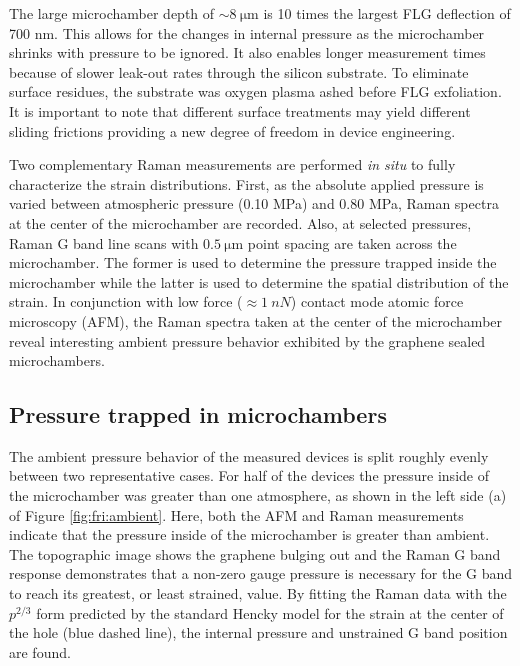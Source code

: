 The large microchamber depth of $\sim 8 \ \mathrm{\mu m}$ is 10 times the largest FLG deflection of 700 nm.
This allows for the changes in internal pressure as the microchamber shrinks with pressure to be ignored.
It also enables longer measurement times because of slower leak-out rates through the silicon substrate.
To eliminate surface residues, the substrate was oxygen plasma ashed before FLG exfoliation.
It is important to note that different surface treatments may yield different sliding frictions providing a new degree of freedom in device engineering. 

Two complementary Raman measurements are performed \emph{in situ} to fully characterize the strain distributions.
First, as the absolute applied pressure is varied between atmospheric pressure (0.10 MPa) and 0.80 MPa, Raman spectra at the center of the microchamber are recorded.
Also, at selected pressures, Raman G band line scans with $ 0.5 \ \mathrm{\mu m}$ point spacing are taken across the microchamber.
The former is used to determine the pressure trapped inside the microchamber while the latter is used to determine the spatial distribution of the strain.
In conjunction with low force ($\approx 1 \ nN$) contact mode atomic force microscopy (AFM), the Raman spectra taken at the center of the microchamber reveal interesting ambient pressure behavior exhibited by the graphene sealed microchambers.

\subsection{Pressure trapped in microchambers\label{sec:fri:ambient}}
The ambient pressure behavior of the measured devices is split roughly evenly between two representative cases.
For half of the devices the pressure inside of the microchamber was greater than one atmosphere, as shown in the left side (a) of Figure \ref{fig:fri:ambient}.
Here, both the AFM and Raman measurements indicate that the pressure inside of the microchamber is greater than ambient.
The topographic image shows the graphene bulging out and the Raman G band response demonstrates that a non-zero gauge pressure is necessary for the G band to reach its greatest, or least strained, value.
By fitting the Raman data with the $p^{2/3}$ form predicted by the standard Hencky model for the strain at the center of the hole (blue dashed line), the internal pressure and unstrained G band position are found.

